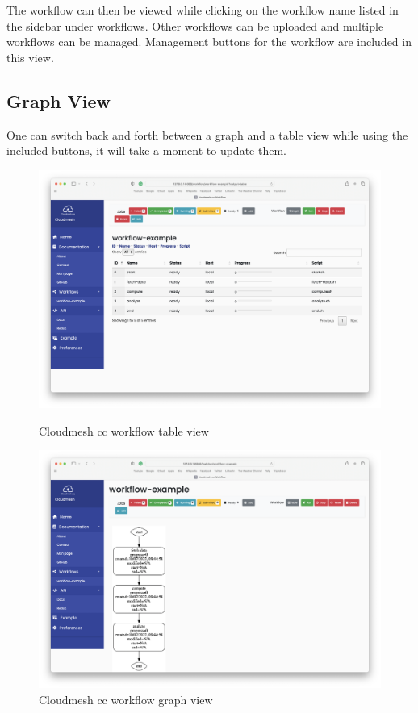The workflow can then be viewed while clicking on the workflow name
listed in the sidebar under workflows. Other workflows can be uploaded
and multiple workflows can be managed. Management buttons for the
workflow are included in this view.


\subsection{Graph View}\label{graph-view}

One can switch back and forth between a graph and a table view while
using the included buttons, it will take a moment to update them.

\begin{figure}[htb]
\centering
\includegraphics[width=1.05\columnwidth]{images/service-table.png}
\caption{Cloudmesh cc workflow table view}

\includegraphics[width=1.05\columnwidth]{images/service-graph.png}
\caption{Cloudmesh cc workflow graph view}
\end{figure}
